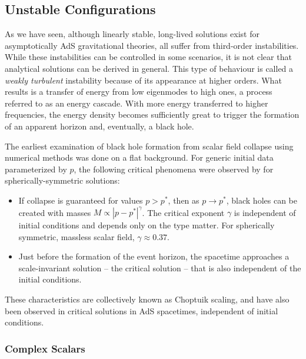 \documentclass[../PhD.tex]{subfiles}
\begin{document}
 
\subsection{Unstable Configurations}
\label{sub: numerical}

As we have seen, although linearly stable, long-lived solutions exist for asymptotically AdS gravitational theories, all suffer from third-order instabilities. While these instabilities can be controlled in some scenarios, it is not clear that analytical solutions can be derived in general. This type of behaviour is called a \emph{weakly turbulent} instability because of its appearance at higher orders. What results is a transfer of energy from low eigenmodes to high ones, a process referred to as an energy cascade. With more energy transferred to higher frequencies, the energy density becomes sufficiently great to trigger the formation of an apparent horizon and, eventually, a black hole.

The earliest examination of black hole formation from scalar field collapse using numerical methods was done on a flat background. For generic initial data parameterized by $p$, the following critical phenomena were observed by \cite{Choptuik:1992jv} for spherically-symmetric solutions:
\begin{itemize}
\item If collapse is guaranteed for values $p > p^*$, then as $p \to p^*$, black holes can be created with masses $M \propto |p - p^*|^\gamma$. The critical exponent $\gamma$ is independent of initial conditions and depends only on the type matter. For spherically symmetric, massless scalar field, $\gamma \approx 0.37$.
\item Just before the formation of the event horizon, the spacetime approaches a scale-invariant solution -- the critical solution -- that is also independent of the initial conditions.
\end{itemize}

These characteristics are collectively known as Choptuik scaling, and have also been observed in critical solutions in AdS spacetimes, independent of initial conditions.

\subsubsection{Complex Scalars}
\end{document}
